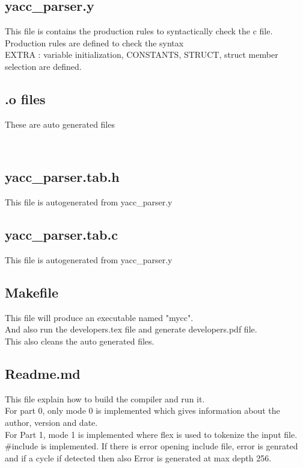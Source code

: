 \documentclass{article}
\begin{document}
\subsection*{yacc\_parser.y}
This file is contains the production rules to syntactically check the c file. \\
Production rules are defined to check the syntax \\
EXTRA : variable initialization, CONSTANTS, STRUCT, struct member selection are defined. \\

\subsection*{.o files}
These are auto generated files

\

\subsection*{yacc\_parser.tab.h}
This file is autogenerated from yacc\_parser.y \\

\subsection*{yacc\_parser.tab.c}
This file is autogenerated from yacc\_parser.y \\

\subsection*{Makefile}
This file will produce an executable named "mycc". \\
And also run the developers.tex file and generate developers.pdf file. \\
This also cleans the auto generated files. \\

\subsection*{Readme.md}
This file explain how to build the compiler and run it. \\
For part 0, only mode 0 is implemented which gives information about the author, version and date. \\
For Part 1,  mode 1 is implemented where flex is used to tokenize the input file. \\
$\#$include is implemented.
If there is error opening include file, error is genrated and if a cycle if detected then also Error is generated at max depth 256. \\
\end{document}
